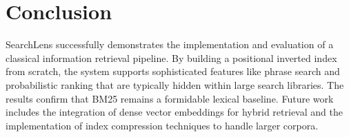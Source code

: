 \documentclass[sigconf,nonacm]{acmart}
\begin{document}
\section{Conclusion}
SearchLens successfully demonstrates the implementation and evaluation of a classical information retrieval pipeline. By building a positional inverted index from scratch, the system supports sophisticated features like phrase search and probabilistic ranking that are typically hidden within large search libraries. The results confirm that BM25 remains a formidable lexical baseline. Future work includes the integration of dense vector embeddings for hybrid retrieval and the implementation of index compression techniques to handle larger corpora.



\end{document}
